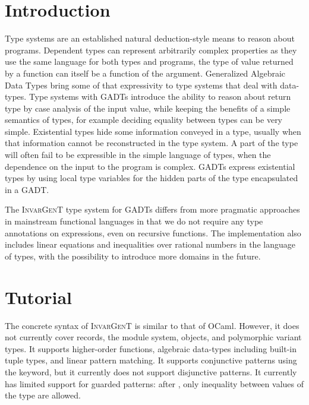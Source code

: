 \documentclass{article}
\newcommand{\tmname}[1]{\textsc{#1}}
\newcommand{\tmverbatim}[1]{{\ttfamily{#1}}}
\begin{document}
\section{Introduction}

Type systems are an established natural deduction-style means to reason about
programs. Dependent types can represent arbitrarily complex properties as they
use the same language for both types and programs, the type of value returned
by a function can itself be a function of the argument. Generalized Algebraic
Data Types bring some of that expressivity to type systems that deal with
data-types. Type systems with GADTs introduce the ability to reason about
return type by case analysis of the input value, while keeping the benefits of
a simple semantics of types, for example deciding equality between types can
be very simple. Existential types hide some information conveyed in a type,
usually when that information cannot be reconstructed in the type system. A
part of the type will often fail to be expressible in the simple language of
types, when the dependence on the input to the program is complex. GADTs
express existential types by using local type variables for the hidden parts
of the type encapsulated in a GADT.

The {\tmname{InvarGenT}} type system for GADTs differs from more pragmatic
approaches in mainstream functional languages in that we do not require any
type annotations on expressions, even on recursive functions. The
implementation also includes linear equations and inequalities over rational
numbers in the language of types, with the possibility to introduce more
domains in the future.

\section{Tutorial}

The concrete syntax of {\tmname{InvarGenT}} is similar to that of OCaml.
However, it does not currently cover records, the module system, objects, and
polymorphic variant types. It supports higher-order functions, algebraic
data-types including built-in tuple types, and linear pattern matching. It
supports conjunctive patterns using the \tmverbatim{as} keyword, but it
currently does not support disjunctive patterns. It currently has limited
support for guarded patterns: after \tmverbatim{when}, only inequality
\tmverbatim{<=} between values of the \tmverbatim{Num} type are allowed.
\end{document}
